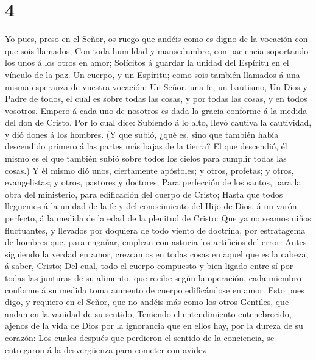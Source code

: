 \hypertarget{section-3}{%
\section{4}\label{section-3}}

 Yo pues, preso en el Señor, os ruego que andéis como es
digno de la vocación con que sois llamados;  Con toda
humildad y mansedumbre, con paciencia soportando los unos á los otros en
amor;  Solícitos á guardar la unidad del Espíritu en el
vínculo de la paz.  Un cuerpo, y un Espíritu; como sois
también llamados á una misma esperanza de vuestra vocación: 
Un Señor, una fe, un bautismo,  Un Dios y Padre de todos, el
cual es sobre todas las cosas, y por todas las cosas, y en todos
vosotros.  Empero á cada uno de nosotros es dada la gracia
conforme á la medida del don de Cristo.  Por lo cual dice:
Subiendo á lo alto, llevó cautiva la cautividad, y dió dones á los
hombres.  (Y que subió, ¿qué es, sino que también había
descendido primero á las partes más bajas de la tierra?  El
que descendió, él mismo es el que también subió sobre todos los cielos
para cumplir todas las cosas.)  Y él mismo dió unos,
ciertamente apóstoles; y otros, profetas; y otros, evangelistas; y
otros, pastores y doctores;  Para perfección de los santos,
para la obra del ministerio, para edificación del cuerpo de Cristo;
 Hasta que todos lleguemos á la unidad de la fe y del
conocimiento del Hijo de Dios, á un varón perfecto, á la medida de la
edad de la plenitud de Cristo:  Que ya no seamos niños
fluctuantes, y llevados por doquiera de todo viento de doctrina, por
estratagema de hombres que, para engañar, emplean con astucia los
artificios del error:  Antes siguiendo la verdad en amor,
crezcamos en todas cosas en aquel que es la cabeza, á saber, Cristo;
 Del cual, todo el cuerpo compuesto y bien ligado entre sí
por todas las junturas de su alimento, que recibe según la operación,
cada miembro conforme á su medida toma aumento de cuerpo edificándose en
amor.  Esto pues digo, y requiero en el Señor, que no
andéis más como los otros Gentiles, que andan en la vanidad de su
sentido,  Teniendo el entendimiento entenebrecido, ajenos
de la vida de Dios por la ignorancia que en ellos hay, por la dureza de
su corazón:  Los cuales después que perdieron el sentido de
la conciencia, se entregaron á la desvergüenza para cometer con avidez
